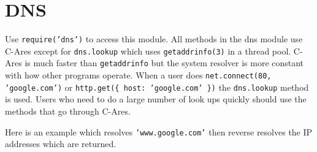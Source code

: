 \section{DNS}

\begin{Shaded}
\begin{Highlighting}[]
\NormalTok{: } 
\end{Highlighting}
\end{Shaded}

Use \texttt{require('dns')} to access this module. All methods in the
dns module use C-Ares except for \texttt{dns.lookup} which uses
\texttt{getaddrinfo(3)} in a thread pool. C-Ares is much faster than
\texttt{getaddrinfo} but the system resolver is more constant with how
other programs operate. When a user does
\texttt{net.connect(80, 'google.com')} or
\texttt{http.get(\{ host: 'google.com' \})} the \texttt{dns.lookup}
method is used. Users who need to do a large number of look ups quickly
should use the methods that go through C-Ares.

Here is an example which resolves \texttt{'www.google.com'} then reverse
resolves the IP addresses which are returned.

\begin{Shaded}
\begin{Highlighting}[]
 \NormalTok{);}

\NormalTok{(}\NormalTok{, } 
    

  \NormalTok{(} \NormalTok{+ }

  \NormalTok{(} 
     
       
         
      \NormalTok{\}}

      \NormalTok{(}  \NormalTok{+ }
    \NormalTok{\});}
  \NormalTok{\});}
\NormalTok{\});}
\end{Highlighting}
\end{Shaded}

